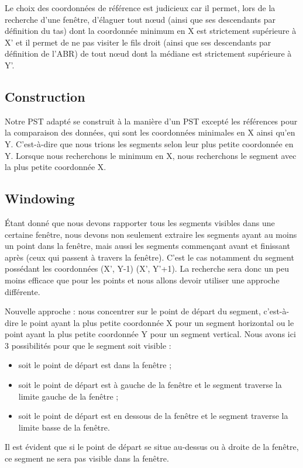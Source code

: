\documentclass[10pt,a4paper]{article}
\begin{document}
Le choix des coordonnées de référence est judicieux car il permet, lors de la recherche d'une fenêtre, d'élaguer tout nœud (ainsi que ses descendants par définition du tas) dont la coordonnée minimum en X est strictement supérieure à X' et il permet de ne pas visiter le fils droit (ainsi que ses descendants par définition de l'ABR) de tout nœud dont la médiane est strictement supérieure à Y'.

\subsection{Construction}
Notre PST adapté se construit à la manière d'un PST excepté les références pour la comparaison des données, qui sont les coordonnées minimales en X ainsi qu'en Y. C'est-à-dire que nous trions les segments selon leur plus petite coordonnée en Y. Lorsque nous recherchons le minimum en X, nous recherchons le segment avec la plus petite coordonnée X.

\subsection{Windowing}
Étant donné que nous devons rapporter tous les segments visibles dans une certaine fenêtre, nous devons non seulement extraire les segments ayant au moins un point dans la fenêtre, mais aussi les segments commençant avant et finissant après (ceux qui passent à travers la fenêtre). C'est le cas notamment du segment possédant les coordonnées (X', Y-1) (X', Y'+1). La recherche sera donc un peu moins efficace que pour les points et nous allons devoir utiliser une approche différente.

Nouvelle approche : nous concentrer sur le point de départ du segment, c'est-à-dire le point ayant la plus petite coordonnée X pour un segment horizontal ou le point ayant la plus petite coordonnée Y pour un segment vertical. Nous avons ici 3 possibilités pour que le segment soit visible :
\begin{itemize}
	\item soit le point de départ est dans la fenêtre ;
	\item soit le point de départ est à gauche de la fenêtre et le segment traverse la limite gauche de la fenêtre ;
	\item soit le point de départ est en dessous de la fenêtre et le segment traverse la limite basse de la fenêtre.
\end{itemize}
Il est évident que si le point de départ se situe au-dessus ou à droite de la fenêtre, ce segment ne sera pas visible dans la fenêtre.
\end{document}
